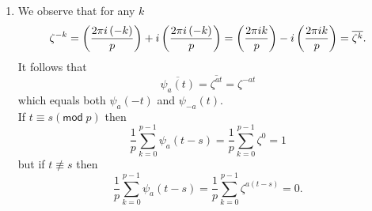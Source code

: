 \documentclass[12pt]{article}
\renewcommand{\pmod}[1]{\left(\mathsf{mod}\;#1\right)}
\let\sin\relax\DeclareMathOperator{\sin}{\mathsf{sin}}
\let\cos\relax\DeclareMathOperator{\cos}{\mathsf{cos}}
\begin{document}
\begin{enumerate}
\item %
We observe that for any $k$
\[\zeta^{-k}=\cos\left(\frac{2\pi i\left(-k\right)}{p}\right)
+i\sin\left(\frac{2\pi i\left(-k\right)}{p}\right)
=\cos\left(\frac{2\pi ik}{p}\right)-i\sin\left(\frac{2\pi ik}{p}\right)
=\overline{\zeta^k}.\]
It follows that
\[\overline{\psi_a\left(t\right)}
=\overline{\zeta^{at}}=\zeta^{-at}\]
which equals both $\psi_a\left(-t\right)$ and $\psi_{-a}\left(t\right)$.
\\
If $t\equiv s\pmod{p}$ then
\[\frac{1}{p}\sum_{k=0}^{p-1}\psi_a\left(t-s\right)
=\frac{1}{p}\sum_{k=0}^{p-1}\zeta^0=1\]
but if $t\not\equiv s$ then
\[\frac{1}{p}\sum_{k=0}^{p-1}\psi_a\left(t-s\right)
=\frac{1}{p}\sum_{k=0}^{p-1}\zeta^{a\left(t-s\right)}=0.\]

\end{enumerate}
\end{document}
